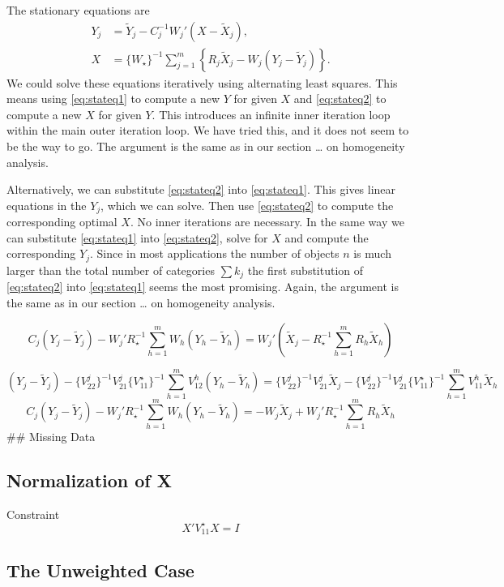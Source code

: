 \documentclass[
  12pt,
]{article}
\begin{document}
The stationary equations are
\begin{align}
Y_j&=\tilde Y_j-C_j^{-1}W_j'(X-\tilde X_j),\label{eq:stateq1}\\
X&=\{W_\star\}^{-1}\sum_{j=1}^m\left\{R_j\tilde X_j-W_j(Y_j-\tilde Y_j)\right\}.\label{eq:stateq2}
\end{align}
We could solve these equations iteratively using alternating least squares. This
means using \eqref{eq:stateq1} to compute a new \(Y\) for given \(X\) and \eqref{eq:stateq2} to compute a new \(X\) for given \(Y\). This introduces an
infinite inner iteration loop within the main outer iteration loop. We have tried this, and it does not seem to be the way to go. The argument is the same as in
our section \ldots{} on homogeneity analysis.

Alternatively, we can substitute \eqref{eq:stateq2} into \eqref{eq:stateq1}. This
gives linear equations in the \(Y_j\), which we can solve. Then use \eqref{eq:stateq2}
to compute the corresponding optimal \(X\). No inner iterations are necessary.
In the same way we can substitute \eqref{eq:stateq1} into \eqref{eq:stateq2}, solve for
\(X\) and compute the corresponding \(Y_j\). Since in most applications the number of
objects \(n\) is much larger than the total number of categories \(\sum k_j\) the first
substitution of \eqref{eq:stateq2} into \eqref{eq:stateq1} seems the most
promising. Again, the argument is the same as in
our section \ldots{} on homogeneity analysis.

\[
C_j(Y_j-\tilde Y_j)-W_j'R_\star^{-1}\sum_{h=1}^mW_h(Y_h-\tilde Y_h)=W_j'(\tilde X_j-R_\star^{-1}\sum_{h=1}^mR_h\tilde X_h)
\]

\[
(Y_j-\tilde Y_j)-\{V_{22}^j\}^{-1}V_{21}^j\{V_{11}^\star\}^{-1}\sum_{h=1}^mV_{12}^h(Y_h-\tilde Y_h)=\{V_{22}^j\}^{-1}V_{21}^j\tilde X_j-\{V_{22}^j\}^{-1}V_{21}^j\{V_{11}^\star\}^{-1}\sum_{h=1}^mV_{11}^h\tilde X_h
\]
\[
C_j(Y_j-\tilde Y_j)-W_j'R_\star^{-1}\sum_{h=1}^mW_h(Y_h-\tilde Y_h)=-W_j\tilde X_j+W_j'R_\star^{-1}\sum_{h=1}^mR_h\tilde X_h
\]
\#\# Missing Data

\subsection{Normalization of X}\label{normalization-of-x}

Constraint
\[
X'V_{11}^\star X = I
\]

\subsection{The Unweighted Case}\label{the-unweighted-case}
\end{document}
